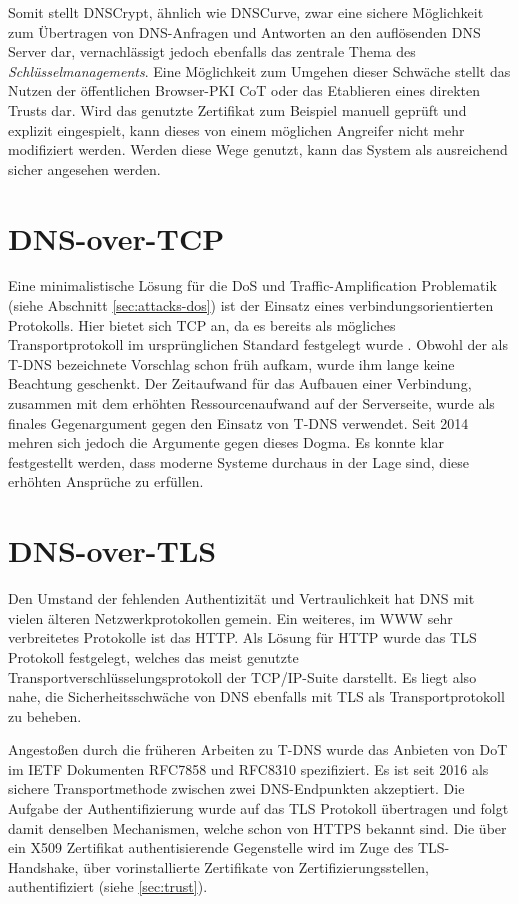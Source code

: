 Somit stellt DNSCrypt, ähnlich wie DNSCurve, zwar eine sichere  Möglichkeit zum Übertragen von DNS-Anfragen und Antworten an den auflösenden DNS Server dar, vernachlässigt jedoch ebenfalls das zentrale Thema des \textit{Schlüsselmanagements}. Eine Möglichkeit zum Umgehen dieser Schwäche stellt das Nutzen der öffentlichen Browser-PKI CoT oder das Etablieren eines direkten Trusts dar. Wird das genutzte Zertifikat zum Beispiel manuell geprüft und explizit eingespielt, kann dieses von einem möglichen Angreifer nicht mehr modifiziert werden. Werden diese Wege genutzt, kann das System als ausreichend sicher angesehen werden.

\section{DNS-over-TCP}
Eine minimalistische Lösung für die DoS und Traffic-Amplification Problematik (siehe Abschnitt \ref{sec:attacks-dos}) ist der Einsatz eines verbindungsorientierten Protokolls. Hier bietet sich TCP an, da es bereits als mögliches Transportprotokoll im ursprünglichen Standard festgelegt wurde \cite{rfc1035}. Obwohl der als \ac{T-DNS} bezeichnete Vorschlag schon früh aufkam, wurde ihm lange keine Beachtung geschenkt. Der Zeitaufwand für das Aufbauen einer Verbindung, zusammen mit dem erhöhten Ressourcenaufwand auf der Serverseite, wurde als finales Gegenargument gegen den Einsatz von \ac{T-DNS} verwendet. Seit 2014 mehren sich jedoch die Argumente gegen dieses Dogma. Es konnte klar festgestellt werden, dass moderne Systeme durchaus in der Lage sind, diese erhöhten Ansprüche zu erfüllen\cite{Zhu2015}. 

\section{DNS-over-TLS}
\label{sec:tec-dot}
Den Umstand der fehlenden Authentizität und Vertraulichkeit hat DNS mit vielen älteren Netzwerkprotokollen gemein. Ein weiteres,  im \ac{WWW} sehr verbreitetes Protokolle ist das \ac{HTTP}. Als Lösung für HTTP wurde das \ac{TLS} Protokoll festgelegt, welches das meist genutzte Transportverschlüsselungsprotokoll der TCP/IP-Suite darstellt. Es liegt also nahe, die Sicherheitsschwäche von DNS ebenfalls mit TLS als Transportprotokoll zu beheben.

Angestoßen durch die früheren Arbeiten zu \ac{T-DNS} wurde das Anbieten von \ac{DoT} im IETF Dokumenten RFC7858\cite{rfc7858} und RFC8310\cite{Dickinson2018} spezifiziert. Es ist seit 2016 als sichere Transportmethode zwischen zwei DNS-Endpunkten akzeptiert. Die Aufgabe der Authentifizierung wurde auf das TLS Protokoll übertragen und folgt damit denselben Mechanismen, welche schon von HTTPS bekannt sind. Die über ein X509 Zertifikat authentisierende Gegenstelle wird im Zuge des TLS-Handshake, über vorinstallierte Zertifikate von Zertifizierungsstellen, authentifiziert (siehe \ref{sec:trust}).

